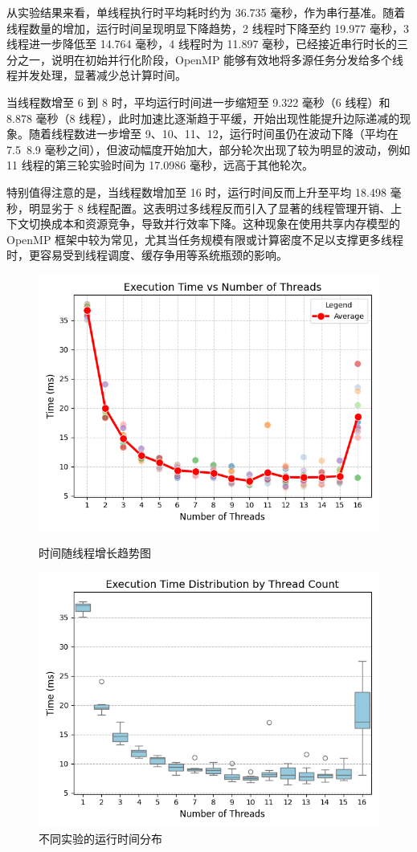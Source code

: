 \documentclass[a4paper, utf8]{ctexart}
\begin{document}
	从实验结果来看，单线程执行时平均耗时约为 36.735 毫秒，作为串行基准。随着线程数量的增加，运行时间呈现明显下降趋势，2 线程时下降至约 19.977 毫秒，3 线程进一步降低至 14.764 毫秒，4 线程时为 11.897 毫秒，已经接近串行时长的三分之一，说明在初始并行化阶段，OpenMP 能够有效地将多源任务分发给多个线程并发处理，显著减少总计算时间。
	
	当线程数增至 6 到 8 时，平均运行时间进一步缩短至 9.322 毫秒（6 线程）和 8.878 毫秒（8 线程），此时加速比逐渐趋于平缓，开始出现性能提升边际递减的现象。随着线程数进一步增至 9、10、11、12，运行时间虽仍在波动下降（平均在 7.5~8.9 毫秒之间），但波动幅度开始加大，部分轮次出现了较为明显的波动，例如 11 线程的第三轮实验时间为 17.0986 毫秒，远高于其他轮次。
	
	特别值得注意的是，当线程数增加至 16 时，运行时间反而上升至平均 18.498 毫秒，明显劣于 8 线程配置。这表明过多线程反而引入了显著的线程管理开销、上下文切换成本和资源竞争，导致并行效率下降。这种现象在使用共享内存模型的 OpenMP 框架中较为常见，尤其当任务规模有限或计算密度不足以支撑更多线程时，更容易受到线程调度、缓存争用等系统瓶颈的影响。
	
	\begin{figure}[htbp]
		\centering
		\begin{minipage}{.45\textwidth}
			\centering
			\includegraphics[width=.8\textwidth]{./figure/TimevsThreads.png}
			\caption{时间随线程增长趋势图}
		\end{minipage}
		\begin{minipage}{.45\textwidth}
			\centering
			\includegraphics[width=.8\textwidth]{./figure/TimeDistribution.png}
			\caption{不同实验的运行时间分布}
		\end{minipage}
	\end{figure}
	
\end{document}
